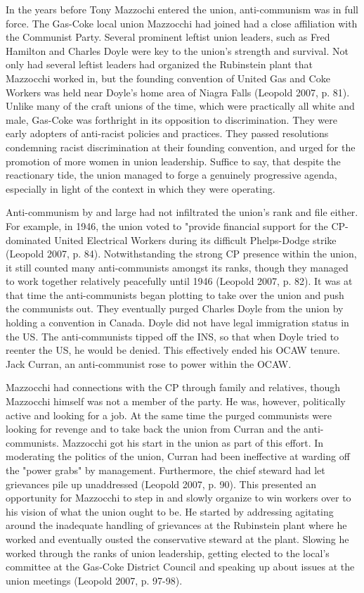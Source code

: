 \documentclass[12pt]{article}
\begin{document}
In the years before Tony Mazzochi entered the union, anti-communism was in full force. The Gas-Coke local union Mazzocchi had joined had a close affiliation with the Communist Party. Several prominent leftist union leaders, such as Fred Hamilton and Charles Doyle were key to the union’s strength and survival. Not only had several leftist leaders had organized the Rubinstein plant that Mazzocchi worked in, but the founding convention of United Gas and Coke Workers was held near Doyle’s home area of Niagra Falls (Leopold 2007, p. 81). Unlike many of the craft unions of the time, which were practically all white and male, Gas-Coke was forthright in its opposition to discrimination. They were early adopters of anti-racist policies and practices. They passed resolutions condemning racist discrimination at their founding convention, and urged for the promotion of more women in union leadership. Suffice to say, that despite the reactionary tide, the union managed to forge a genuinely progressive agenda, especially in light of the context in which they were operating.

Anti-communism by and large had not infiltrated the union’s rank and file either. For example, in 1946, the union voted to "provide financial support for the CP-dominated United Electrical Workers during its difficult Phelps-Dodge strike (Leopold 2007, p. 84). Notwithstanding the strong CP presence within the union, it still counted many anti-communists amongst its ranks, though they managed to work together relatively peacefully until 1946 (Leopold 2007, p. 82). It was at that time the anti-communists began plotting to take over the union and push the communists out. They eventually purged Charles Doyle from the union by holding a convention in Canada. Doyle did not have legal immigration status in the US. The anti-communists tipped off the INS, so that when Doyle tried to reenter the US, he would be denied. This effectively ended his OCAW tenure. Jack Curran, an anti-communist rose to power within the OCAW.

Mazzocchi had connections with the CP through family and relatives, though Mazzocchi himself was not a member of the party. He was, however, politically active and looking for a job. At the same time the purged communists were looking for revenge and to take back the union from Curran and the anti-communists. Mazzocchi got his start in the union as part of this effort. In moderating the politics of the union, Curran had been ineffective at warding off the "power grabs" by management. Furthermore, the chief steward had let grievances pile up unaddressed (Leopold 2007, p. 90). This presented an opportunity for Mazzocchi to step in and slowly organize to win workers over to his vision of what the union ought to be. He started by addressing agitating around the inadequate handling of grievances at the Rubinstein plant where he worked and eventually ousted the conservative steward at the plant. Slowing he worked through the ranks of union leadership, getting elected to the local’s committee at the Gas-Coke District Council and speaking up about issues at the union meetings (Leopold 2007, p. 97-98). 
\end{document}
